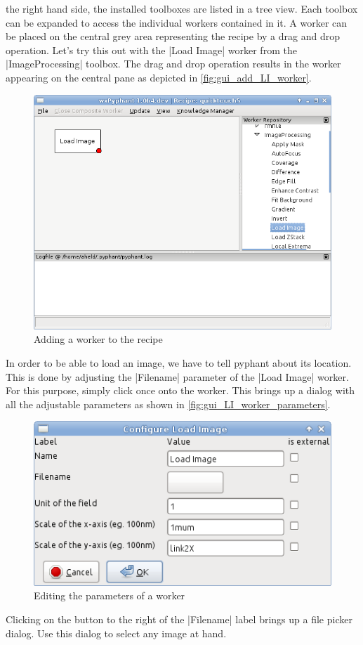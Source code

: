 \documentclass[a4paper]{article}
\begin{document}
the right hand side, the installed toolboxes are listed in a tree
view. Each toolbox can be expanded to access the individual workers
contained in it. A worker can be placed on the central grey area
representing the recipe by a drag and drop operation. Let's try this
out with the |Load Image| worker from the |ImageProcessing|
toolbox. The drag and drop operation results in the worker appearing
on the central pane as depicted in \autoref{fig:gui_add_LI_worker}.
\begin{figure}[h]
  \centering
  \includegraphics[scale=0.75]{fig/gui_add_LI_worker.png}
  \caption{Adding a worker to the recipe}
  \label{fig:gui_add_LI_worker}
\end{figure}
In order to be able to load an image, we have to tell pyphant about
its location. This is done by adjusting the |Filename| parameter of
the |Load Image| worker. For this purpose, simply click once onto the
worker. This brings up a dialog with all the adjustable parameters as
shown in \autoref{fig:gui_LI_worker_parameters}.
\begin{figure}[h]
  \centering
  \includegraphics[scale=0.75]{fig/gui_LI_worker_parameters.png}
  \caption{Editing the parameters of a worker}
  \label{fig:gui_LI_worker_parameters}
\end{figure}
Clicking on the button to the right of the |Filename| label brings up
a file picker dialog. Use this dialog to select any image at hand.
\end{document}
